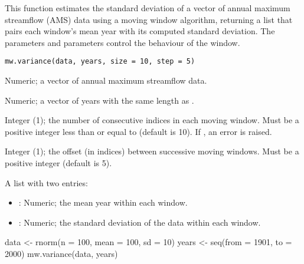 \documentclass[a4paper]{book}
\begin{document}
%
\begin{Description}
This function estimates the standard deviation of a vector of annual maximum
streamflow (AMS) data using a moving window algorithm, returning a list that
pairs each window’s mean year with its computed standard deviation. The
parameters  and  parameters control the behaviour of the window.
\end{Description}
%
\begin{Usage}
\begin{verbatim}
mw.variance(data, years, size = 10, step = 5)
\end{verbatim}
\end{Usage}
%
\begin{Arguments}
\begin{ldescription}
\item[\code{data}] Numeric; a vector of annual maximum streamflow data.

\item[\code{years}] Numeric; a vector of years with the same length as .

\item[\code{size}] Integer (1); the number of consecutive indices in each moving
window. Must be a positive integer less than or equal to 
(default is 10). If , an error is raised.

\item[\code{step}] Integer (1); the offset (in indices) between successive moving
windows. Must be a positive integer (default is 5).
\end{ldescription}
\end{Arguments}
%
\begin{Value}
A list with two entries:
\begin{itemize}

\item{} : Numeric; the mean year within each window.
\item{} : Numeric; the standard deviation of the data within each window.

\end{itemize}

\end{Value}
%
\begin{Examples}
\begin{ExampleCode}
data <- rnorm(n = 100, mean = 100, sd = 10)
years <- seq(from = 1901, to = 2000)
mw.variance(data, years)

\end{ExampleCode}
\end{Examples}
\end{document}
